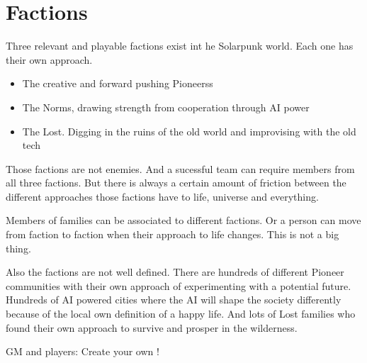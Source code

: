 \chapter{Factions}

Three relevant and playable factions exist int he Solarpunk world. Each one has their own approach. 

\begin{itemize}
    \item The creative and forward pushing Pioneerss
    \item The Norms, drawing strength from cooperation through AI power
    \item The Lost. Digging in the ruins of the old world and improvising with the old tech
\end{itemize}

Those factions are not enemies. And a sucessful team can require members from all three factions. But there is always a certain amount of friction between the different approaches those factions have to life, universe and everything.

Members of families can be associated to different factions. Or a person can move from faction to faction when their approach to life changes. This is not a big thing.

Also the factions are not well defined. There are hundreds of different Pioneer communities with their own approach of experimenting with a potential future. Hundreds of AI powered cities where the AI will shape the society differently because of the local own definition of a happy life. And lots of Lost families who found their own approach to survive and prosper in the wilderness.

GM and players: Create your own !